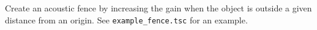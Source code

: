 Create an acoustic fence by increasing the gain when the object is
outside a given distance from an origin. See \verb!example_fence.tsc! for an example.





